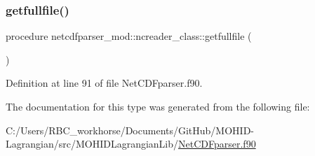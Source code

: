 \subsubsection{\texorpdfstring{getfullfile()}{getfullfile()}}
{\footnotesize\ttfamily procedure netcdfparser\+\_\+mod\+::ncreader\+\_\+class\+::getfullfile (\begin{DoxyParamCaption}{ }\end{DoxyParamCaption})\hspace{0.3cm}{\ttfamily [private]}}



Definition at line 91 of file Net\+C\+D\+Fparser.\+f90.



The documentation for this type was generated from the following file\+:\begin{DoxyCompactItemize}
\item 
C\+:/\+Users/\+R\+B\+C\+\_\+workhorse/\+Documents/\+Git\+Hub/\+M\+O\+H\+I\+D-\/\+Lagrangian/src/\+M\+O\+H\+I\+D\+Lagrangian\+Lib/\mbox{\hyperlink{_net_c_d_fparser_8f90}{Net\+C\+D\+Fparser.\+f90}}\end{DoxyCompactItemize}
